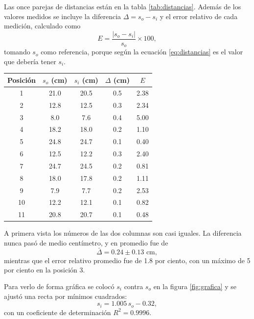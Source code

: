 Las once parejas de distancias están en la tabla \ref{tab:distancias}. Además de los valores medidos se incluye la diferencia $\Delta = s_o - s_i$ y el error relativo de cada medición, calculado como
\begin{equation}
E = \frac{\left| s_o - s_i \right|}{s_o} \times 100 ,
\label{eq:error}
\end{equation}
tomando $s_o$ como referencia, porque según la ecuación \eqref{eq:distancias} es el valor que debería tener $s_i$.

\begin{center}
\begin{tabular}{ccccc}
\hline
Posición & $s_o$ (cm) & $s_i$ (cm) & $\Delta$ (cm) & $E$ \\
\hline
1  & 21.0 & 20.5 & 0.5 & 2.38 \\
2  & 12.8 & 12.5 & 0.3 & 2.34 \\
3  & 8.0  & 7.6  & 0.4 & 5.00 \\
4  & 18.2 & 18.0 & 0.2 & 1.10 \\
5  & 24.8 & 24.7 & 0.1 & 0.40 \\
6  & 12.5 & 12.2 & 0.3 & 2.40 \\
7  & 24.7 & 24.5 & 0.2 & 0.81 \\
8  & 18.0 & 17.8 & 0.2 & 1.11 \\
9  & 7.9  & 7.7  & 0.2 & 2.53 \\
10 & 12.2 & 12.1 & 0.1 & 0.82 \\
11 & 20.8 & 20.7 & 0.1 & 0.48 \\
\hline
\end{tabular}
\label{tab:distancias}
\end{center}

A primera vista los números de las dos columnas son casi iguales. La diferencia nunca pasó de medio centímetro, y en promedio fue de
\begin{equation}
\bar{\Delta} = 0.24 \pm 0.13 \text{ cm},
\label{eq:promedio}
\end{equation}
mientras que el error relativo promedio fue de 1.8 por ciento, con un máximo de 5 por ciento en la posición 3.

Para verlo de forma gráfica se colocó $s_i$ contra $s_o$ en la figura \ref{fig:grafica} y se ajustó una recta por mínimos cuadrados:
\begin{equation}
s_i = 1.005 \, s_o - 0.32 ,
\label{eq:ajuste}
\end{equation}
con un coeficiente de determinación $R^2 = 0.9996$.


